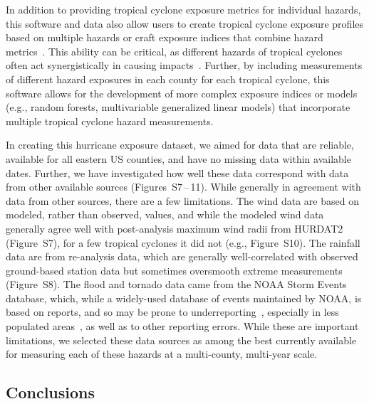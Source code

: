 In addition to providing tropical cyclone exposure metrics for individual
hazards, this software and data also allow users to create tropical cyclone
exposure profiles based on multiple hazards or craft exposure indices that
combine hazard metrics~\parencite{chakraborty2005population, peduzzi2009assessing}.
This ability can be critical, as different hazards of tropical cyclones
often act synergistically in causing impacts~\parencite{smith2009}. Further, by
including measurements of different hazard exposures in each county for each
tropical cyclone, this software allows for the development of more complex
exposure indices or models (e.g., random forests, multivariable generalized
linear models) that incorporate multiple tropical cyclone hazard measurements.  

In creating this hurricane exposure dataset, we aimed for data that are
reliable, available for all eastern \ac{US} counties, and have no missing data
within available dates. Further, we have investigated how well these data
correspond with data from other available sources
(Figures~S7\,--\,11). While generally in agreement with
data from other sources, there are a few limitations. The wind data are based
on modeled, rather than observed, values, and while the modeled wind data
generally agree well with post-analysis maximum wind radii from
\ac{HURDAT2}~\parencite{landsea2013} (Figure~S7), for a
few tropical cyclones it did not (e.g., Figure~S10). The
rainfall data are from re-analysis data, which are generally well-correlated
with observed ground-based station data but sometimes oversmooth extreme
measurements (Figure~S8).  The flood and tornado data came
from the \ac{NOAA} Storm Events database, which, while a widely-used database
of events maintained by \ac{NOAA}, is based on reports, and so may be prone to
underreporting~\parencite{Ashley2008flood, Curran2000}, especially in less
populated areas~\parencite{Witt1998, Ashley2007}, as well as to other reporting
errors. While these are important limitations, we selected these data sources
as among the best currently available for measuring each of these hazards at a
multi-county, multi-year scale.

\subsection*{Conclusions}

